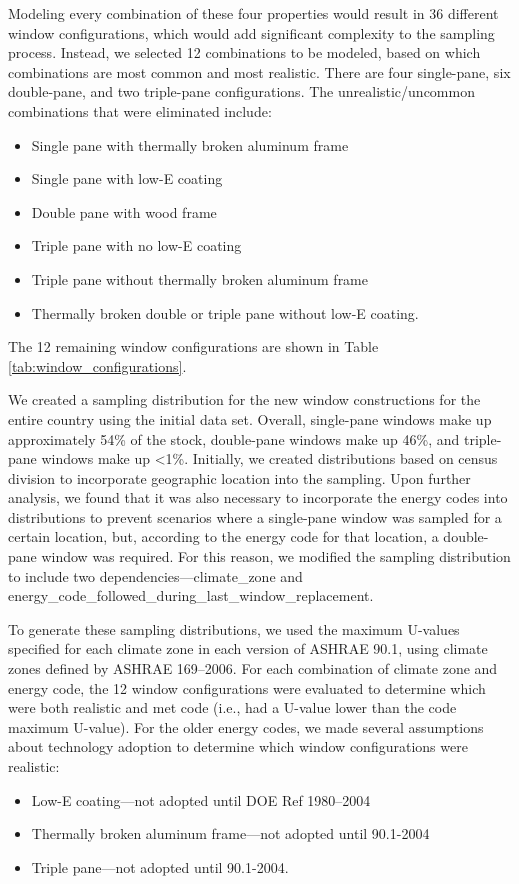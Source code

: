 Modeling every combination of these four properties would result in 36 different window configurations, which would add significant complexity to the sampling process. Instead, we selected 12 combinations to be modeled, based on which combinations are most common and most realistic. There are four single-pane, six double-pane, and two triple-pane configurations. The unrealistic/uncommon combinations that were eliminated include:
\begin{itemize}
\item Single pane with thermally broken aluminum frame
\item Single pane with low-E coating
\item Double pane with wood frame
\item Triple pane with no low-E coating
\item Triple pane without thermally broken aluminum frame
\item Thermally broken double or triple pane without low-E coating.
\end{itemize}
The 12 remaining window configurations are shown in Table \ref{tab:window_configurations}.



We created a sampling distribution for the new window constructions for the entire country using the initial data set. Overall, single-pane windows make up approximately 54\% of the stock, double-pane windows make up 46\%, and triple-pane windows make up <1\%. Initially, we created distributions based on census division to incorporate geographic location into the sampling. Upon further analysis, we found that it was also necessary to incorporate the energy codes into distributions to prevent scenarios where a single-pane window was sampled for a certain location, but, according to the energy code for that location, a double-pane window was required. For this reason, we modified the sampling distribution to include two dependencies---climate\_zone and  energy\_code\_followed\_during\_last\_window\_replacement.

To generate these sampling distributions, we used the maximum U-values specified for each climate zone in each version of ASHRAE 90.1, using climate zones defined by ASHRAE 169--2006. For each combination of climate zone and energy code, the 12 window configurations were evaluated to determine which were both realistic and met code (i.e., had a U-value lower than the code maximum U-value). For the older energy codes, we made several assumptions about technology adoption to determine which window configurations were realistic:
\begin{itemize}
    \item Low-E coating---not adopted until DOE Ref 1980--2004
    \item Thermally broken aluminum frame---not adopted until 90.1-2004
    \item Triple pane---not adopted until 90.1-2004.
\end{itemize}

